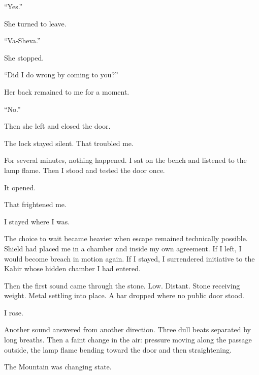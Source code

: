 ``Yes.''\par

She turned to leave.\par

``Va-Sheva.''\par

She stopped.\par

``Did I do wrong by coming to you?''\par

Her back remained to me for a moment.\par

``No.''\par

Then she left and closed the door.\par

The lock stayed silent. That troubled me.\par

For several minutes, nothing happened. I sat on the bench and listened to the lamp flame. Then I stood and tested the door once.\par

It opened.\par

That frightened me.\par

I stayed where I was.\par

The choice to wait became heavier when escape remained technically possible. Shield had placed me in a chamber and inside my own agreement. If I left, I would become breach in motion again. If I stayed, I surrendered initiative to the Kahir whose hidden chamber I had entered.\par

Then the first sound came through the stone. Low. Distant. Stone receiving weight. Metal settling into place. A bar dropped where no public door stood.\par

I rose.\par

Another sound answered from another direction. Three dull beats separated by long breaths. Then a faint change in the air: pressure moving along the passage outside, the lamp flame bending toward the door and then straightening.\par

The Mountain was changing state.\par

